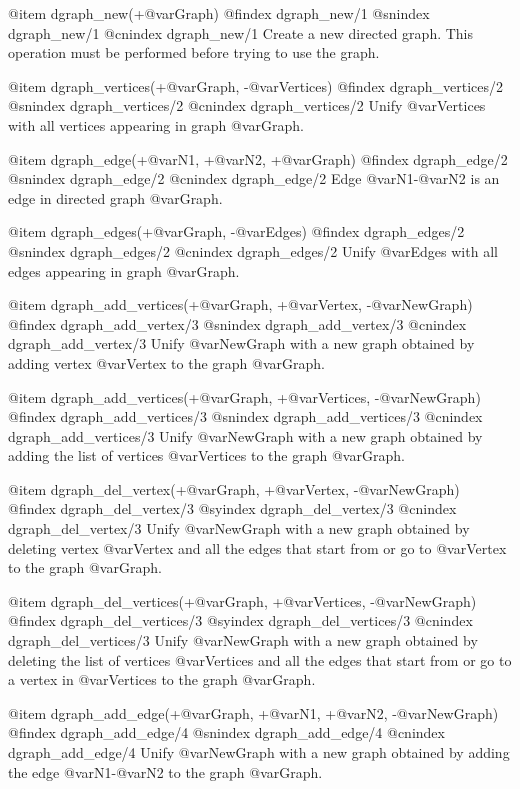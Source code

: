 {{{{{{{{@item dgraph_new(+@var{Graph})
@findex  dgraph_new/1
@snindex dgraph_new/1
@cnindex dgraph_new/1
Create a new directed graph. This operation must be performed before
trying to use the graph.

@item dgraph_vertices(+@var{Graph}, -@var{Vertices})
@findex  dgraph_vertices/2
@snindex dgraph_vertices/2
@cnindex dgraph_vertices/2
Unify @var{Vertices} with all vertices appearing in graph
@var{Graph}.

@item dgraph_edge(+@var{N1}, +@var{N2}, +@var{Graph})
@findex  dgraph_edge/2
@snindex dgraph_edge/2
@cnindex dgraph_edge/2
Edge @var{N1}-@var{N2} is an edge in directed graph @var{Graph}.

@item dgraph_edges(+@var{Graph}, -@var{Edges})
@findex  dgraph_edges/2
@snindex dgraph_edges/2
@cnindex dgraph_edges/2
Unify @var{Edges} with all edges appearing in graph
@var{Graph}.

@item dgraph_add_vertices(+@var{Graph}, +@var{Vertex}, -@var{NewGraph})
@findex  dgraph_add_vertex/3
@snindex dgraph_add_vertex/3
@cnindex dgraph_add_vertex/3
Unify @var{NewGraph} with a new graph obtained by adding
vertex @var{Vertex} to the graph @var{Graph}.

@item dgraph_add_vertices(+@var{Graph}, +@var{Vertices}, -@var{NewGraph})
@findex  dgraph_add_vertices/3
@snindex dgraph_add_vertices/3
@cnindex dgraph_add_vertices/3
Unify @var{NewGraph} with a new graph obtained by adding the list of
vertices @var{Vertices} to the graph @var{Graph}.

@item dgraph_del_vertex(+@var{Graph}, +@var{Vertex}, -@var{NewGraph})
@findex  dgraph_del_vertex/3
@syindex dgraph_del_vertex/3
@cnindex dgraph_del_vertex/3
Unify @var{NewGraph} with a new graph obtained by deleting vertex
@var{Vertex} and all the edges that start from or go to @var{Vertex} to
the graph @var{Graph}.

@item dgraph_del_vertices(+@var{Graph}, +@var{Vertices}, -@var{NewGraph})
@findex  dgraph_del_vertices/3
@syindex dgraph_del_vertices/3
@cnindex dgraph_del_vertices/3
Unify @var{NewGraph} with a new graph obtained by deleting the list of
vertices @var{Vertices} and all the edges that start from or go to a
vertex in @var{Vertices} to the graph @var{Graph}.

@item dgraph_add_edge(+@var{Graph}, +@var{N1}, +@var{N2}, -@var{NewGraph})
@findex  dgraph_add_edge/4
@snindex dgraph_add_edge/4
@cnindex dgraph_add_edge/4
Unify @var{NewGraph} with a new graph obtained by adding the edge
@var{N1}-@var{N2} to the graph @var{Graph}.

}}}}}}}}
